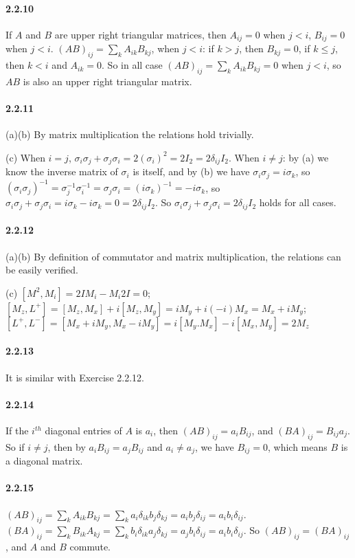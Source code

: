 \documentclass[a4paper]{article}
\begin{document}
\paragraph{2.2.10}
If $A$ and $B$ are upper right triangular matrices, then $A_{ij}=0$ when $j<i$, $B_{ij}=0$ when $j<i$. $(AB)_{ij}=\sum_k A_{ik}B_{kj}$, when $j<i$: if $k>j$, then $B_{kj}=0$, if $k\leq j$, then $k<i$ and $A_{ik}=0$. So in all case $(AB)_{ij}=\sum_k A_{ik}B_{kj}=0$ when $j<i$, so $AB$ is also an upper right triangular matrix.

\paragraph{2.2.11}
(a)(b) By matrix multiplication the relations hold trivially.

(c) When $i=j$, $\sigma_i\sigma_j+\sigma_j\sigma_i=2(\sigma_i)^2=2I_2=2\delta_{ij}I_2$. When $i\neq j$: by (a) we know the inverse matrix of $\sigma_i$ is itself, and by (b) we have $\sigma_i\sigma_j=i\sigma_k$, so $(\sigma_i\sigma_j)^{-1}=\sigma_j^{-1}\sigma_i^{-1}=\sigma_j\sigma_i=(i\sigma_k)^{-1}=-i\sigma_k$, so $\sigma_i\sigma_j+\sigma_j\sigma_i=i\sigma_k-i\sigma_k=0=2\delta_{ij}I_2$. So $\sigma_i\sigma_j+\sigma_j\sigma_i=2\delta_{ij}I_2$ holds for all cases.

\paragraph{2.2.12}
(a)(b) By definition of commutator and matrix multiplication, the relations can be easily verified.

(c) $[M^2,M_i]=2IM_i-M_i2I=0$; $[M_z,L^+]=[M_z,M_x]+i[M_z,M_y]=iM_y+i(-i)M_x=M_x+iM_y$; $[L^+,L^-]=[M_x+iM_y,M_x-iM_y]=i[M_y.M_x]-i[M_x,M_y]=2M_z$

\paragraph{2.2.13}
It is similar with Exercise 2.2.12.

\paragraph{2.2.14}
If the $i^{th}$ diagonal entries of $A$ is $a_i$, then $(AB)_{ij}=a_iB_{ij}$, and $(BA)_{ij}=B_{ij}a_j$. So if $i\neq j$, then by $a_iB_{ij}=a_jB_{ij}$ and $a_i\neq a_j$, we have $B_{ij}=0$, which means $B$ is a diagonal matrix.

\paragraph{2.2.15}
$(AB)_{ij}=\sum_k A_{ik}B_{kj}=\sum_k a_i\delta_{ik}b_j\delta_{kj}=a_ib_j\delta_{ij}=a_ib_i\delta_{ij}$. $(BA)_{ij}=\sum_k B_{ik}A_{kj}=\sum_k b_i\delta_{ik}a_j\delta_{kj}=a_jb_i\delta_{ij}=a_ib_i\delta_{ij}$. So $(AB)_{ij}=(BA)_{ij}$, and $A$ and $B$ commute.
\end{document}
